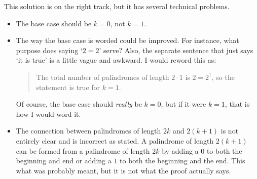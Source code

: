 \begin{eval}
\begin{answer}
\begin{pfevalenum}
\item
This solution is on the right track,  but it has several technical problems.  
	\begin{itemize}
	\item
	The base case should
	be $k=0$, not $k=1$.  
	\item
	The way the base case is worded could be improved.  For instance, 
	what purpose does saying `$2=2$' serve?  Also, the separate sentence that just says `it is true' is
	a little vague and awkward.  I would reword this as:
		\begin{quote}
		The total number of palindromes of length $2\cdot 1$ is $2=2^1$, so the statement is true for $k=1$.
		\end{quote}
	Of course, the base case should {\em really} be $k=0$, but if it were $k=1$, that is how I would word it.
	\item 
	The connection between palindromes of length $2k$ and $2(k+1)$ is not entirely clear and is incorrect
	as stated.  A palindrome of length $2(k+1)$ can be formed from a palindrome of length $2k$ by adding
	a $0$ to both the beginning and end or adding a $1$ to both the beginning and the end.  
	This what was probably meant, but it is not what the proof actually says. 
	 

\end{itemize}
\end{pfevalenum}
\end{answer}
\end{eval}
